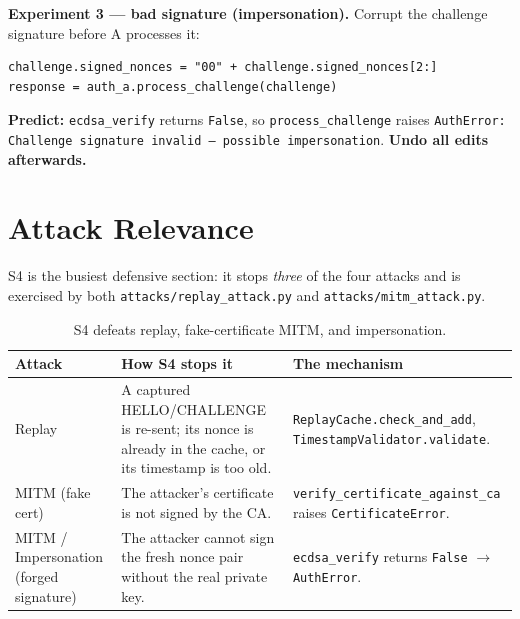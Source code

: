 \documentclass[11pt,a4paper]{report}
\begin{document}
\textbf{Experiment 3 --- bad signature (impersonation).} Corrupt the challenge
signature before A processes it:
\begin{lstlisting}[style=term]
challenge.signed_nonces = "00" + challenge.signed_nonces[2:]
response = auth_a.process_challenge(challenge)
\end{lstlisting}
\textbf{Predict:} \texttt{ecdsa\_verify} returns \texttt{False}, so
\texttt{process\_challenge} raises \texttt{AuthError: Challenge signature invalid
-- possible impersonation}. \textbf{Undo all edits afterwards.}

\section{Attack Relevance}

S4 is the busiest defensive section: it stops \emph{three} of the four attacks
and is exercised by both \texttt{attacks/replay\_attack.py} and
\texttt{attacks/mitm\_attack.py}.

\begin{table}[h]
\centering
\small
\begin{tabular}{@{}p{2.5cm} p{6.0cm} p{5.0cm}@{}}
\toprule
\textbf{Attack} & \textbf{How S4 stops it} & \textbf{The mechanism}\\
\midrule
Replay & A captured HELLO/CHALLENGE is re-sent; its nonce is already in the
cache, or its timestamp is too old. & \texttt{ReplayCache.check\_and\_add},
\texttt{TimestampValidator.validate}.\\
MITM (fake cert) & The attacker's certificate is not signed by the CA. &
\texttt{verify\_certificate\_against\_ca} raises \texttt{CertificateError}.\\
MITM / Impersonation (forged signature) & The attacker cannot sign the fresh
nonce pair without the real private key. & \texttt{ecdsa\_verify} returns
\texttt{False} $\to$ \texttt{AuthError}.\\
\bottomrule
\end{tabular}
\caption{S4 defeats replay, fake-certificate MITM, and impersonation.}
\end{table}
\end{document}
